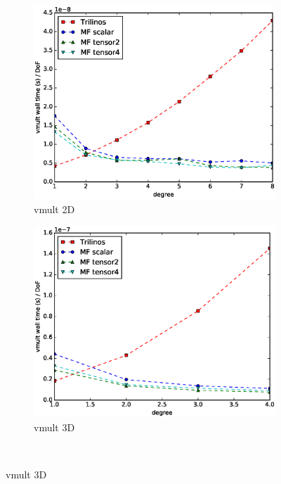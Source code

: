 \documentclass[preprint,12pt,times]{elsarticle}
\begin{document}
\begin{figure}[!ht]
  \centering
  \begin{subfigure}[b]{0.45\textwidth}
      \centering
      \includegraphics[width=\textwidth]{IWR_timing2d.eps}
      \caption{vmult 2D}
      \label{fig:benchmark_miehe_IWR_vmult2}
  \end{subfigure}
  \begin{subfigure}[b]{0.45\textwidth}
    \centering
    \includegraphics[width=\textwidth]{IWR_timing3d.eps}
    \caption{vmult 3D}
    \label{fig:benchmark_miehe_IWR_vmult3}
  \end{subfigure}
  ~

\end{figure}
\end{document}
